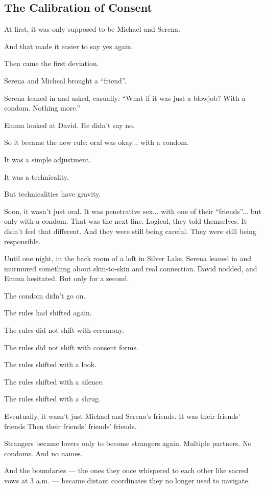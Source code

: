 
\subsection{The Calibration of Consent}

At first, it was only supposed to be Michael and Serena.

And that made it easier to say yes again.

Then came the first deviation.

Serena and Micheal brought a ``friend''.

Serena leaned in and asked, casually: 
``What if it was just a blowjob? With a condom. Nothing more.''

Emma looked at David. He didn’t say no.

So it became the new rule: oral was okay... with a condom.

It was a simple adjustment. 

It was a technicality.

But technicalities have gravity.

Soon, it wasn’t just oral.
It was penetrative sex... with one of their ``friends''... but only with a condom.
That was the next line. Logical, they told themselves. It didn’t feel that different. And they were 
still being careful. They were still being responsible.

Until one night, in the back room of a loft in Silver Lake, Serena leaned in and murmured something 
about skin-to-skin and real connection. David nodded, and Emma hesitated. But only for a second.

The condom didn’t go on.

The rules had shifted again.

The rules did not shift with ceremony. 

The rules did not shift with consent forms.

The rules shifted with a look. 

The rules shifted with a silence. 

The rules shifted with a shrug.

Eventually, it wasn’t just Michael and Serena's friends.
It was their friends' friends
Then their friends’ friends' friends.

Strangers became lovers only to become strangers again.
Multiple partners.
No condoms.
And no names.

And the boundaries --- the ones they once whispered to each other like sacred vows at 
3 a.m. --- became distant coordinates they no longer used to navigate.

